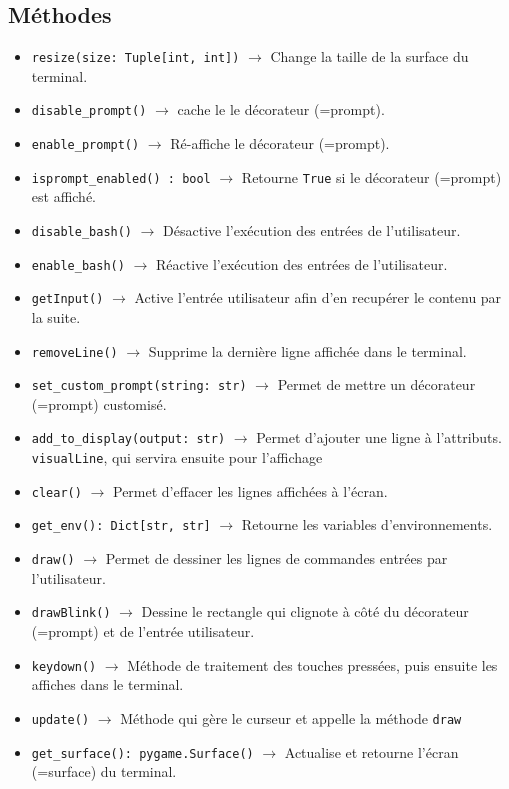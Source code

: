 \documentclass{report}
\begin{document}
\subsection*{Méthodes}
\begin{itemize}
  \item \texttt{resize(size: Tuple[int, int])}		$\rightarrow$ Change la taille de la surface du terminal.
  \item \texttt{disable_prompt()}		$\rightarrow$  cache le le décorateur (=prompt).
  \item \texttt{enable_prompt()}		$\rightarrow$ Ré-affiche le décorateur (=prompt).
  \item \texttt{isprompt_enabled() : bool}		$\rightarrow$ Retourne \texttt{True} si le décorateur (=prompt) est affiché.
  \item \texttt{disable_bash()}		$\rightarrow$ Désactive l'exécution des entrées de l'utilisateur.
  \item \texttt{enable_bash()}		$\rightarrow$ Réactive l'exécution des entrées de l'utilisateur.
  \item \texttt{getInput()}		$\rightarrow$ Active l’entrée utilisateur afin d'en recupérer le contenu par la suite.
  \item \texttt{removeLine()}		$\rightarrow$ Supprime la dernière ligne affichée dans le terminal.
  \item \texttt{set_custom_prompt(string: str)}		$\rightarrow$ Permet de mettre un décorateur (=prompt) customisé.
  \item \texttt{add_to_display(output: str)}		$\rightarrow$ Permet d’ajouter une ligne à l’attributs. \texttt{visualLine}, qui servira ensuite pour l’affichage
  \item \texttt{clear()} $\rightarrow$ Permet d’effacer les lignes affichées à l’écran.
  \item \texttt{get_env(): Dict[str, str]}		$\rightarrow$ Retourne les variables d'environnements.
  \item \texttt{draw()}	$\rightarrow$ Permet de dessiner les lignes de commandes entrées par l’utilisateur.
  \item \texttt{drawBlink()}		$\rightarrow$ Dessine le rectangle qui clignote à côté du décorateur (=prompt) et de l'entrée utilisateur.
  \item \texttt{keydown()}		$\rightarrow$ Méthode de traitement des touches pressées, puis ensuite les affiches dans le terminal.
  \item \texttt{update()}		$\rightarrow$  Méthode qui gère le curseur et appelle la méthode \texttt{draw}
  \item \texttt{get_surface(): pygame.Surface()}		$\rightarrow$ Actualise et retourne l'écran (=surface) du terminal.
\end{itemize}
\newpage
\end{document}
